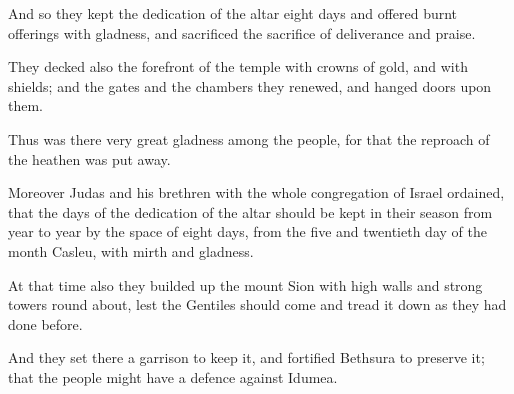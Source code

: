 {\par }{\PP {}And so they kept the dedication of the altar eight days and offered burnt offerings with gladness, and sacrificed the sacrifice of deliverance and praise.
\par }{\PP {}They decked also the forefront of the temple with crowns of gold, and with shields; and the gates and the chambers they renewed, and hanged doors upon them.
\par }{\PP {}Thus was there very great gladness among the people, for that the reproach of the heathen was put away.
\par }{\PP {}Moreover Judas and his brethren with the whole congregation of Israel ordained, that the days of the dedication of the altar should be kept in their season from year to year by the space of eight days, from the five and twentieth day of the month Casleu, with mirth and gladness.
\par }{\PP {}At that time also they builded up the mount Sion with high walls and strong towers round about, lest the Gentiles should come and tread it down as they had done before.
\par }{\PP {}And they set there a garrison to keep it, and fortified Bethsura to preserve it; that the people might have a defence against Idumea.

}
